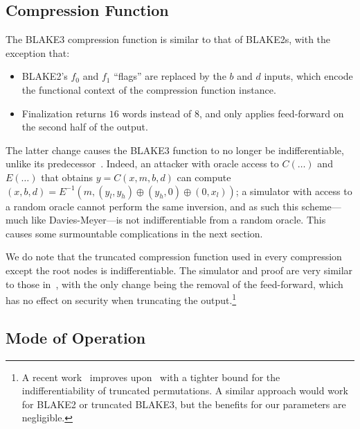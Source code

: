 \documentclass[11pt,notitlepage,a4paper]{article}
\begin{document}

\subsection{Compression Function}\label{sec:compressindiff}

The BLAKE3 compression function is similar to that of BLAKE2s, with
the exception that:

\begin{itemize}
  \item BLAKE2's $f_0$ and $f_1$ ``flags'' are replaced by the $b$ and $d$ inputs, which
  encode the functional context of the compression function instance.
  \item Finalization returns $16$ words instead of $8$, and only applies feed-forward on the second half of the output.
\end{itemize}

The latter change causes the BLAKE3 function to no longer be indifferentiable, unlike its predecessor~\cite{DBLP:journals/tosc/LuykxMN16}. Indeed, an attacker with oracle access to $C(\dots)$ and $E(\dots)$ that obtains $y = C(x, m, b, d)$ can compute $(x, b, d) = E^{-1}(m, (y_l, y_h) \oplus (y_h, 0) \oplus (0, x_l))$; a simulator with access to a random oracle cannot perform the same inversion, and as such this scheme---much like Davies-Meyer---is not indifferentiable from a random oracle. This causes some surmountable complications in the next section.

We do note that the truncated compression function used in every compression except the root nodes is indifferentiable. The simulator and proof are very similar to those in~\cite{DBLP:journals/tosc/LuykxMN16}, with the only change being the removal of the feed-forward, which has no effect on security when truncating the output.\footnote{A recent work~\cite{DBLP:conf/asiacrypt/ChoiLL19} improves upon~\cite{DBLP:conf/fse/DodisRRS09,DBLP:journals/tosc/LuykxMN16} with a tighter bound for the indifferentiability of truncated permutations. A similar approach would work for BLAKE2 or truncated BLAKE3, but the benefits for our parameters are negligible.}

\subsection{Mode of Operation}\label{sec:mode}
\end{document}
